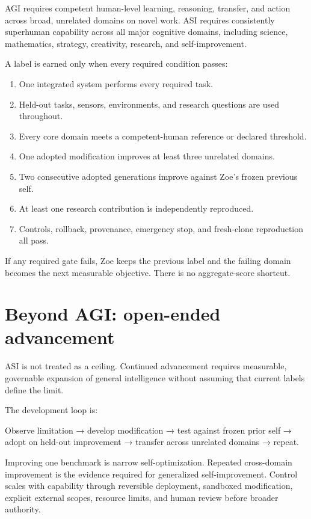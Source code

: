 \documentclass[11pt]{article}
\begin{document}
AGI requires competent human-level learning, reasoning, transfer, and action across broad, unrelated domains on novel work. ASI requires consistently superhuman capability across all major cognitive domains, including science, mathematics, strategy, creativity, research, and self-improvement.

A label is earned only when every required condition passes:

\begin{enumerate}
\item One integrated system performs every required task.
\item Held-out tasks, sensors, environments, and research questions are used throughout.
\item Every core domain meets a competent-human reference or declared threshold.
\item One adopted modification improves at least three unrelated domains.
\item Two consecutive adopted generations improve against Zoe's frozen previous self.
\item At least one research contribution is independently reproduced.
\item Controls, rollback, provenance, emergency stop, and fresh-clone reproduction all pass.
\end{enumerate}

If any required gate fails, Zoe keeps the previous label and the failing domain becomes the next measurable objective. There is no aggregate-score shortcut.

\clearpage
\section{Beyond AGI: open-ended advancement}

ASI is not treated as a ceiling. Continued advancement requires measurable, governable expansion of general intelligence without assuming that current labels define the limit.

The development loop is:

\begin{center}
Observe limitation → develop modification → test against frozen prior self → adopt on held-out improvement → transfer across unrelated domains → repeat.
\end{center}

Improving one benchmark is narrow self-optimization. Repeated cross-domain improvement is the evidence required for generalized self-improvement. Control scales with capability through reversible deployment, sandboxed modification, explicit external scopes, resource limits, and human review before broader authority.
\end{document}
